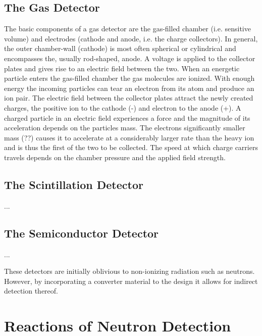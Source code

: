 \subsection{The Gas Detector}
The basic components of a gas detector are the gas-filled chamber (i.e. sensitive volume) and electrodes (cathode and anode, i.e. the charge collectors). In general, the outer chamber-wall (cathode) is most often spherical or cylindrical and encompasses the, usually rod-shaped, anode.  A voltage is applied to the collector plates and gives rise to an electric field between the two.
When an energetic particle enters the gas-filled chamber the gas molecules are ionized. With enough energy the incoming particles can tear an electron from its atom and produce an ion pair. The electric field between the collector plates attract the newly created charges, the positive ion to the cathode (-) and electron to the anode (+).
A charged particle in an electric field experiences a force and the magnitude of its acceleration depends on the particles mass. The electrons significantly smaller mass (??) causes it to accelerate at a considerably larger rate than the heavy ion and is thus the first of the two to be collected. The speed at which charge carriers travels depends on the chamber pressure and the applied field strength.

\subsection{The Scintillation Detector}
...
\subsection{The Semiconductor Detector}
...


These detectors are initially oblivious to non-ionizing radiation such as neutrons. However, by incorporating a converter material to the design it allows for indirect detection thereof.

\section{Reactions of Neutron Detection}


